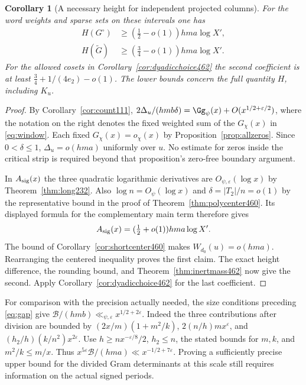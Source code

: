 \documentclass[a4paper,11pt]{article}
\newtheorem{corollary}[proposition]{Corollary}
\theoremstyle{definition}
\theoremstyle{remark}
\numberwithin{equation}{section}
\begin{document}
\begin{corollary}[A necessary height for independent projected columns]\leavevmode
\label{cor:heightfloor463}
For the word weights and sparse sets on these intervals one has
\[
 \begin{split}
        H(G^\circ)&\ge(\tfrac12-o(1))hma\log X',\\
        H(\widetilde G)&\ge(\tfrac34-o(1))hma\log X'.
 \end{split}
\]
For the allowed cosets in Corollary~\ref{cor:dyadicchoice462}
the second coefficient is at least
\(\tfrac34+1/(4e_2)-o(1)\). The lower bounds concern the full
quantity \(H\), including \(K_u\).
\end{corollary}
\begin{proof}
By Corollary~\ref{cor:count111},
\(2\Delta_u/(hmb\delta)=\Gg_\psi(x)
+O(x^{1/2+\varepsilon/2})\), where the notation on the right
denotes the fixed weighted sum of the \(G_\chi(x)\) in
\eqref{eq:window}. Each fixed \(G_\chi(x)=o_\chi(x)\) by
Proposition~\ref{prop:allzeros}. Since \(0<\delta\le1\),
\(\Delta_u=o(hma)\) uniformly over \(u\). No estimate for
zeros inside the critical strip is required beyond that
proposition's zero-free boundary argument.

In \(A_{\rm sig}(x)\) the three quadratic logarithmic
derivatives are \(O_{\psi,\varepsilon}(\log x)\) by
Theorem~\ref{thm:long232}. Also \(\log n=O_\psi(\log x)\)
and \(\delta=|T_2|/n=o(1)\) by the representative bound in
the proof of Theorem~\ref{thm:polycenter460}. Its displayed
formula for the complementary main term therefore gives
\[
                A_{\rm sig}(x)
                  =(\tfrac12+o(1))hma\log X'.
\]
The bound of Corollary~\ref{cor:shortcenter460} makes
\(W_{d_0}(u)=o(hma)\). Rearranging the centered inequality
proves the first claim. The exact height difference, the
rounding bound, and Theorem~\ref{thm:inertmass462} now give
the second. Apply Corollary~\ref{cor:dyadicchoice462} for the
last coefficient.
\end{proof}

For comparison with the precision actually needed, the size
conditions preceding \eqref{eq:gap} give
\(\mathcal B/(hmb)\ll_{\psi,\varepsilon}x^{1/2+2\varepsilon}\).
Indeed the three contributions after division are bounded by
\((2x/m)(1+m^2/k)\), \(2(n/h)mx^\varepsilon\), and
\((h_2/h)(k/n^2)x^{2\varepsilon}\). Use
\(h\ge n x^{-\varepsilon/8}/2\), \(h_2\le n\), the stated
bounds for \(m,k\), and \(m^2/k\le m/x\).
Thus \(x^{5\varepsilon}\mathcal B/(hma)
\ll x^{-1/2+7\varepsilon}\). Proving a sufficiently precise
upper bound for the divided Gram determinants at this scale
still requires information on the actual signed periods.
\end{document}
